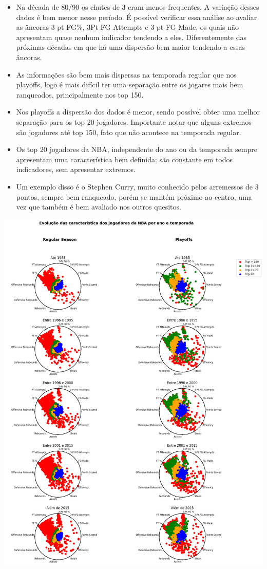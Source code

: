 \documentclass[
]{book}
\providecommand{\tightlist}{%
  \setlength{\itemsep}{0pt}\setlength{\parskip}{0pt}}
\begin{document}
\begin{itemize}
\tightlist
\item
  Na década de 80/90 os chutes de 3 eram menos frequentes. A variação desses dados é bem menor nesse período. É possível verificar essa análise ao avaliar as âncoras 3-pt FG\%, 3Pt FG Attempts e 3-pt FG Made, os quais não apresentam quase nenhum indicador tendendo a eles. Diferentemente das próximas décadas em que há uma dispersão bem maior tendendo a essas âncoras.
\item
  As informações são bem mais dispersas na temporada regular que nos playoffs, logo é mais difícil ter uma separação entre os jogares mais bem ranqueados, principalmente nos top 150.
\item
  Nos playoffs a dispersão dos dados é menor, sendo possível obter uma melhor separação para os top 20 jogadores. Importante notar que alguns extremos são jogadores até top 150, fato que não acontece na temporada regular.
\item
  Os top 20 jogadores da NBA, independente do ano ou da temporada sempre apresentam uma característica bem definida: são constante em todos indicadores, sem apresentar extremos.
\item
  Um exemplo disso é o Stephen Curry, muito conhecido pelos arremessos de 3 pontos, sempre bem ranqueado, porém se mantém próximo ao centro, uma vez que também é bem avaliado nos outros quesitos.
\end{itemize}

\includegraphics{imagens/14.png}
\end{document}
